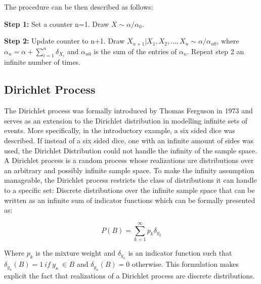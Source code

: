 \documentclass[twoside,hidelinks]{article}
\begin{document}
The procedure can be then described as follows:
\begin{compactitem}

	\item \textbf{Step 1:} Set a counter n=1. Draw $ X \sim \alpha / \alpha_0 $. 
	\item \textbf{Step 2:} Update counter to n+1. Draw $ X_{n+1} | X_1, X_2, ..., X_n \sim \alpha / \alpha_{n0}$, where $\alpha_n = \alpha + \sum_{i=1}^n \delta_{X_i} $ and $ \alpha_{n0}$ is the sum of the entries of $\alpha_n$. Repeat step 2 an infinite number of times.
\end{compactitem}

\subsection{Dirichlet Process}

The Dirichlet process was formally introduced by Thomas Ferguson in 1973 and serves as an extension to the Dirichlet distribution in modelling infinite sets of events. More specifically, in the introductory example, a six sided dice was described. If instead of a six sided dice, one with an infinite amount of sides was used, the Dirichlet Distribution could not handle the infinity of the sample space. A Dirichlet process is a random process whose realizations are distributions over an arbitrary and possibly infinite sample space. To make the infinity assumption manageable, the Dirichlet process restricts the class of distributions it can handle to a specific set: Discrete distributions over the infinite sample space that can be written as an infinite sum of indicator functions which can be formally presented as:

\begin{equation}
 P( B ) = \sum_{k=1}^\infty p_k \delta_{y_k} 
 \end{equation}

Where $p_k$ is the mixture weight and $\delta_{y_\kappa}$ is an indicator function such that $\delta_{y_\kappa} (B)=1\ if\ y_{\kappa}\ \in B$ and  $\delta_{y_\kappa}(B)=0$ otherwise. This formulation makes explicit the fact that realizations of a Dirichlet process are discrete distributions.
\end{document}
